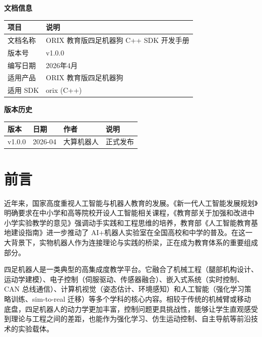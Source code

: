 \documentclass[a4paper,11pt,openany]{book}
\begin{document}
\thispagestyle{empty}
\vspace*{\fill}
\noindent\textbf{文档信息}\\[0.5em]
\begin{tabular}{ll}
\toprule
项目 & 说明 \\
\midrule
文档名称 & ORIX 教育版四足机器狗 C++ SDK 开发手册 \\
版本号   & v1.0.0 \\
编写日期 & 2026年4月 \\
适用产品 & ORIX 教育版四足机器狗 \\
适用 SDK & orix (C++) \\
\bottomrule
\end{tabular}

\vspace{2em}
\noindent\textbf{版本历史}\\[0.5em]
\begin{tabular}{llll}
\toprule
版本 & 日期 & 作者 & 说明 \\
\midrule
v1.0.0 & 2026-04 & 大算机器人 & 正式发布 \\
\bottomrule
\end{tabular}

\vspace{2em}
\newpage

\tableofcontents
\newpage

\chapter*{前言}
\thispagestyle{fancy}

近年来，国家高度重视人工智能与机器人教育的发展。《新一代人工智能发展规划》明确要求在中小学和高等院校开设人工智能相关课程，《教育部关于加强和改进中小学实验教学的意见》强调动手实践和工程思维的培养，教育部《人工智能教育基地建设指南》进一步推动了 AI+机器人实验室在全国高校和中学的普及。在这一大背景下，实物机器人作为连接理论与实践的桥梁，正在成为教育体系的重要组成部分。

四足机器人是一类典型的高集成度教学平台。它融合了机械工程（腿部机构设计、运动学建模）、电子控制（伺服驱动、传感器融合）、嵌入式系统（实时控制、CAN 总线通信）、计算机视觉（姿态估计、环境感知）和人工智能（强化学习策略训练、sim-to-real 迁移）等多个学科的核心内容。相较于传统的机械臂或移动底盘，四足机器人的动力学更加丰富，控制问题更具挑战性，能够让学生直观感受到理论与工程之间的差距，也能作为强化学习、仿生运动控制、自主导航等前沿技术的实验载体。
\end{document}
